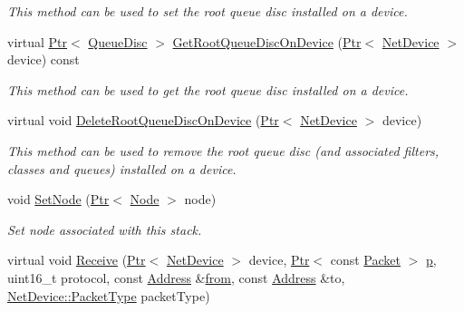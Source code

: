 \begin{DoxyCompactItemize}
\begin{DoxyCompactList}\small\item\em This method can be used to set the root queue disc installed on a device. \end{DoxyCompactList}\item 
virtual \hyperlink{classns3_1_1Ptr}{Ptr}$<$ \hyperlink{classns3_1_1QueueDisc}{Queue\+Disc} $>$ \hyperlink{classns3_1_1TrafficControlLayer_ac623c250089d239f91931d3cd021552c}{Get\+Root\+Queue\+Disc\+On\+Device} (\hyperlink{classns3_1_1Ptr}{Ptr}$<$ \hyperlink{classns3_1_1NetDevice}{Net\+Device} $>$ device) const 
\begin{DoxyCompactList}\small\item\em This method can be used to get the root queue disc installed on a device. \end{DoxyCompactList}\item 
virtual void \hyperlink{classns3_1_1TrafficControlLayer_a7b162c6b30b1a5e628a68f8fd9f59c1e}{Delete\+Root\+Queue\+Disc\+On\+Device} (\hyperlink{classns3_1_1Ptr}{Ptr}$<$ \hyperlink{classns3_1_1NetDevice}{Net\+Device} $>$ device)
\begin{DoxyCompactList}\small\item\em This method can be used to remove the root queue disc (and associated filters, classes and queues) installed on a device. \end{DoxyCompactList}\item 
void \hyperlink{classns3_1_1TrafficControlLayer_ab2ceb8b90b3418c201f9ecd0ed0c5467}{Set\+Node} (\hyperlink{classns3_1_1Ptr}{Ptr}$<$ \hyperlink{classns3_1_1Node}{Node} $>$ node)
\begin{DoxyCompactList}\small\item\em Set node associated with this stack. \end{DoxyCompactList}\item 
virtual void \hyperlink{classns3_1_1TrafficControlLayer_ac8d6ccbab480b6b288aa155b8485e178}{Receive} (\hyperlink{classns3_1_1Ptr}{Ptr}$<$ \hyperlink{classns3_1_1NetDevice}{Net\+Device} $>$ device, \hyperlink{classns3_1_1Ptr}{Ptr}$<$ const \hyperlink{classns3_1_1Packet}{Packet} $>$ \hyperlink{lte__link__budget__x2__handover__measures_8m_ac9de518908a968428863f829398a4e62}{p}, uint16\+\_\+t protocol, const \hyperlink{classns3_1_1Address}{Address} \&\hyperlink{lte__amc_8m_a1b4c81ff74eb1a626b5ade44c81004b3}{from}, const \hyperlink{classns3_1_1Address}{Address} \&to, \hyperlink{classns3_1_1NetDevice_ace65153f09144f55a0d3e702fc29d6b2}{Net\+Device\+::\+Packet\+Type} packet\+Type)

\end{DoxyCompactItemize}
